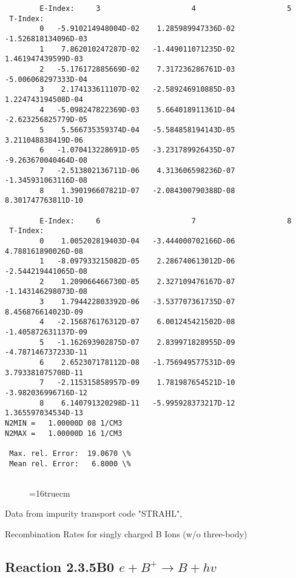 \documentclass[12pt,dvipdfmx]{article}
\begin{document}
{\begin{small}
\begin{verbatim}
        E-Index:     3                     4                     5
 T-Index:
        0   -5.910214948004D-02    1.285989947336D-02   -1.526818134096D-03
        1    7.862010247287D-02   -1.449011071235D-02    1.461947439599D-03
        2   -5.176172885669D-02    7.317236286761D-03   -5.006068297333D-04
        3    2.174133611107D-02   -2.589246910885D-03    1.224743194508D-04
        4   -5.098247822369D-03    5.664018911361D-04   -2.623256825779D-05
        5    5.566735359374D-04   -5.584858194143D-05    3.211048838419D-06
        6   -1.070413228691D-05   -3.231789926435D-07   -9.263670040464D-08
        7   -2.513802136711D-06    4.313606598236D-07   -1.345931063116D-08
        8    1.390196607821D-07   -2.084300790388D-08    8.301747763811D-10

        E-Index:     6                     7                     8
 T-Index:
        0    1.005202819403D-04   -3.444000702166D-06    4.788161890026D-08
        1   -8.097933215082D-05    2.286740613012D-06   -2.544219441065D-08
        2    1.209066466730D-05    2.327109476167D-07   -1.143146298073D-08
        3    1.794422803392D-06   -3.537707361735D-07    8.456876614023D-09
        4   -2.156876176312D-07    6.001245421502D-08   -1.405872631137D-09
        5   -1.162693902875D-07    2.839971828955D-09   -4.787146737233D-11
        6    2.652307178112D-08   -1.756949577531D-09    3.793381075708D-11
        7   -2.115315858957D-09    1.781987654521D-10   -3.982036996716D-12
        8    6.140791320298D-11   -5.995928373217D-12    1.365597034534D-13
N2MIN =   1.00000D 08 1/CM3
N2MAX =   1.00000D 16 1/CM3

 Max. rel. Error:  19.0670 \%
 Mean rel. Error:   6.8000 \%


\end{verbatim}\end{small}
\begin{figure} \label{2.3.4B1}
\epsfxsize=16truecm
\end{figure}
\newpage
Data from impurity transport code "STRAHL", \cite{kn:Behringer}

  Recombination Rates for singly charged B Ions (w/o three-body)
\subsection{
Reaction 2.3.5B0 $ e + B^+ \rightarrow B + hv $
}


}
\end{document}
